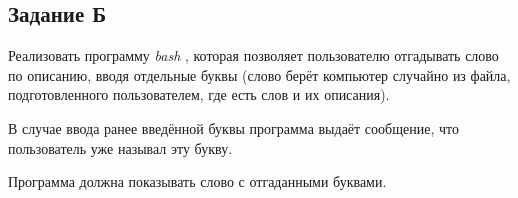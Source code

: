 \documentclass[12pt, a4paper]{report}
\begin{document}
		\lstset{style=mystyle}
		
		
		\subsection*{Задание Б}
		Реализовать программу \textit{bash} , которая позволяет пользователю отгадывать слово по описанию, вводя отдельные буквы (слово берёт компьютер случайно из файла, подготовленного пользователем, где есть слов и их описания). \par
		В случае ввода ранее введённой буквы программа выдаёт сообщение, что пользователь уже называл эту букву. \par
		Программа должна показывать слово с отгаданными буквами.

		\lstset{style=mystyle}
		
	
\end{document}
